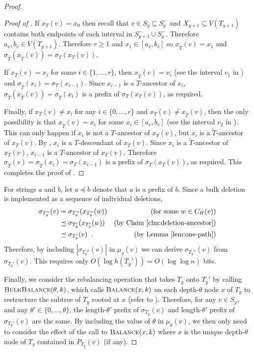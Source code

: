 \documentclass[kpfonts]{patmorin}
\let\ge\geqslant
\begin{document}
\begin{proof}
\begin{proof}[Proof of ]
    If $x_T(v)=x_0$ then recall that $v\in S_y\subseteq S^-_y$ and $X_{y+1}\subseteq V(T_{y+1})$ contains both endpoints of each interval in $S^-_{y+1}\cup S^-_y$.  Therefore $a_v,b_v\in V(T_{y+1})$.  Therefore $r\ge 1$ and $x_1\in [a_v,b_v]$ so $x_{\tilde{T}}(v)=x_1$ and $\sigma_{\tilde{T}}(x_{\tilde{T}}(v))=\sigma_T(x_T(v))$.

    If $x_T(v)=x_i$ for some $i\in\{1,\ldots,r\}$, then $x_{\tilde{T}}(v)=x_i$ (see the interval $v_1$ in ) and $\sigma_{\tilde{T}}(x_i)=\sigma_{T}(x_{i-1})$.  Since $x_{i-1}$ is a $T$-ancestor of $x_i$, $\sigma_{\tilde{T}}(x_{\tilde{T}}(v))=\sigma_{\tilde{T}}(x_i)$ is a prefix of $\sigma_{T}(x_{T}(v))$, as required.

    Finally, if $x_T(v)\neq x_i$ for any $i\in\{0,\ldots,r\}$ and $x_T(v)\neq x_{\tilde{T}}(v)$, then the only possibility is that $x_{\tilde{T}}(v)=x_i$ for some $x_i\in [a_v,b_v]$ (see the interval $v_2$ in ).  This can only happen if $x_i$ is not a $T$-ancestor of $x_T(v)$, but $x_i$ is a $\tilde{T}$-ancestor of $x_T(v)$.  By , $x_i$ is a $T$-descendant of $x_T(v)$.  Since $x_i$ is a $\tilde{T}$-ancestor of $x_T(v)$, $x_{i-1}$ is a $T$-ancestor of $x_T(v)$.  Therefore $\sigma_{\tilde{T}}(v)=\sigma_{\tilde{T}}(x_i)=\sigma_T(x_{i-1})$ is a prefix of $\sigma_T(x_T(v))$, as required.  This completes the proof of .
  \end{proof}

  For strings $a$ and $b$, let $a\preceq b$ denote that $a$ is a prefix of $b$.
  Since a bulk deletion is implemented as a sequence of individual deletions,
  \begin{align*}
    \sigma_{T_y''}(v)
      & = \sigma_{T_y''}(x_{T_y''}(w)) & \text{(for some $w\in C_H(v)$)} \\
      & \preceq \sigma_{T_y'}(x_{T_y'}(w)) & \text{(by \clmref{deletion-ancestor})} \\
      & \preceq \sigma_{T_y'}(v) \enspace . & \text{(by \lemref{one-path})}
  \end{align*}
  Therefore, by including $|\sigma_{T_y''}(v)|$ in $\mu_y(v)$ we can derive $\sigma_{T_y''}(v)$ from $\sigma_{T_y'}(v)$.  This requires only $O(\log h({T_y'}))=O(\log\log n)$ bits.

  Finally, we consider the rebalancing operation that takes $T_y$ onto $T_y'$ by calling $\textsc{BulkBalance}(\theta,k)$, which calls $\textsc{Balance}(x,k)$ on each depth-$\theta$ node $x$ of $T_y$ to restructure the subtree of $T_y$ rooted at $x$ (refer to ). Therefore, for any $v\in S_y$, and any $\theta'\in\{0,\ldots,\theta\}$, the length-$\theta'$ prefix of $\sigma_{T_y}(v)$ and length-$\theta'$ prefix of $\sigma_{T_y'}(v)$ are the same.  By including the value of $\theta$ in $\mu_y(v)$, we then only need to consider the effect of the call to $\textsc{Balance}(x,k)$ where $x$ is the unique depth-$\theta$ node of $T_y$ contained in $P_{T_y}(v)$ (if any).


\end{proof}
\end{document}
